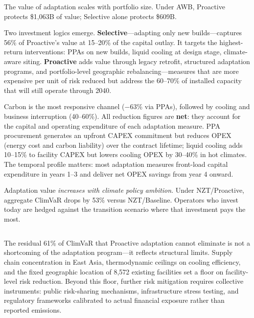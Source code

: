\begin{twocolbody}

\noindent The value of adaptation scales with portfolio size. Under AWB, Proactive protects \$1,063B of value; Selective alone protects \$609B.

Two investment logics emerge. \textbf{Selective}---adapting only new builds---captures 56\% of Proactive's value at 15--20\% of the capital outlay. It targets the highest-return interventions: PPAs on new builds, liquid cooling at design stage, climate-aware siting. \textbf{Proactive} adds value through legacy retrofit, structured adaptation programs, and portfolio-level geographic rebalancing---measures that are more expensive per unit of risk reduced but address the 60--70\% of installed capacity that will still operate through 2040.

Carbon is the most responsive channel ($-$63\% via PPAs), followed by cooling and business interruption (40--60\%). All reduction figures are \textbf{net}: they account for the capital and operating expenditure of each adaptation measure. PPA procurement generates an upfront CAPEX commitment but reduces OPEX (energy cost and carbon liability) over the contract lifetime; liquid cooling adds 10--15\% to facility CAPEX but lowers cooling OPEX by 30--40\% in hot climates. The temporal profile matters: most adaptation measures front-load capital expenditure in years 1--3 and deliver net OPEX savings from year 4 onward.

Adaptation value \textit{increases with climate policy ambition}. Under NZT/Proactive, aggregate ClimVaR drops by 53\% versus NZT/Baseline. Operators who invest today are hedged against the transition scenario where that investment pays the most.

\end{twocolbody}

\subsection*{}
\greensep

\begin{twocolbody}

\noindent The residual 61\% of ClimVaR that Proactive adaptation cannot eliminate is not a shortcoming of the adaptation program---it reflects structural limits. Supply chain concentration in East Asia, thermodynamic ceilings on cooling efficiency, and the fixed geographic location of 8,572 existing facilities set a floor on facility-level risk reduction. Beyond this floor, further risk mitigation requires collective instruments: public risk-sharing mechanisms, infrastructure stress testing, and regulatory frameworks calibrated to actual financial exposure rather than reported emissions.

\end{twocolbody}

